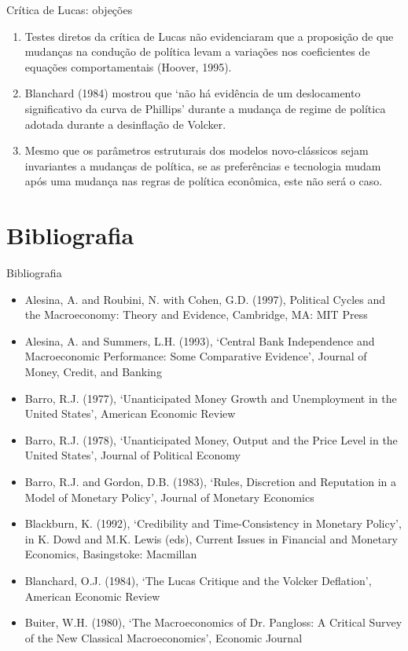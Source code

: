 \documentclass[10pt]{beamer}
\begin{document}
\begin{frame}{Crítica de Lucas: objeções}
    \begin{enumerate}
        \item Testes diretos da crítica de Lucas não evidenciaram que a proposição de que mudanças na condução de política levam a variações nos coeficientes de equações comportamentais (Hoover, 1995).
        \bigskip
        \item Blanchard (1984) mostrou que `não há evidência de um deslocamento significativo da curva de Phillips' durante a mudança de regime de política adotada durante a desinflação de Volcker.
        \bigskip
        \item Mesmo que os parâmetros estruturais dos modelos novo-clássicos sejam invariantes a mudanças de política, se as preferências e tecnologia mudam após uma mudança nas regras de política econômica, este não será o caso.
    \end{enumerate}
\end{frame}

\section{Bibliografia}
\begin{frame}{ Bibliografia}
    \begin{itemize}                        
        \item Alesina, A. and Roubini, N. with Cohen, G.D. (1997), Political Cycles and the Macroeconomy: Theory and Evidence, Cambridge, MA: MIT Press\medskip
        \item Alesina, A. and Summers, L.H. (1993), ‘Central Bank Independence and Macroeconomic Performance: Some Comparative Evidence’, Journal of Money, Credit, and Banking\medskip
        \item Barro, R.J. (1977), ‘Unanticipated Money Growth and Unemployment in the United States’, American Economic Review\medskip
        \item Barro, R.J. (1978), ‘Unanticipated Money, Output and the Price Level in the United States’, Journal of Political Economy\medskip
        \item Barro, R.J. and Gordon, D.B. (1983), ‘Rules, Discretion and Reputation in a Model of Monetary Policy’, Journal of Monetary Economics\medskip
        \item Blackburn, K. (1992), ‘Credibility and Time-Consistency in Monetary Policy’, in K. Dowd and M.K. Lewis (eds), Current Issues in Financial and Monetary Economics, Basingstoke: Macmillan\medskip
        \item Blanchard, O.J. (1984), ‘The Lucas Critique and the Volcker Deflation’, American Economic Review\medskip
        \item Buiter, W.H. (1980), ‘The Macroeconomics of Dr. Pangloss: A Critical Survey of the New Classical Macroeconomics’, Economic Journal\medskip        
    \end{itemize}
\end{frame}
\end{document}
